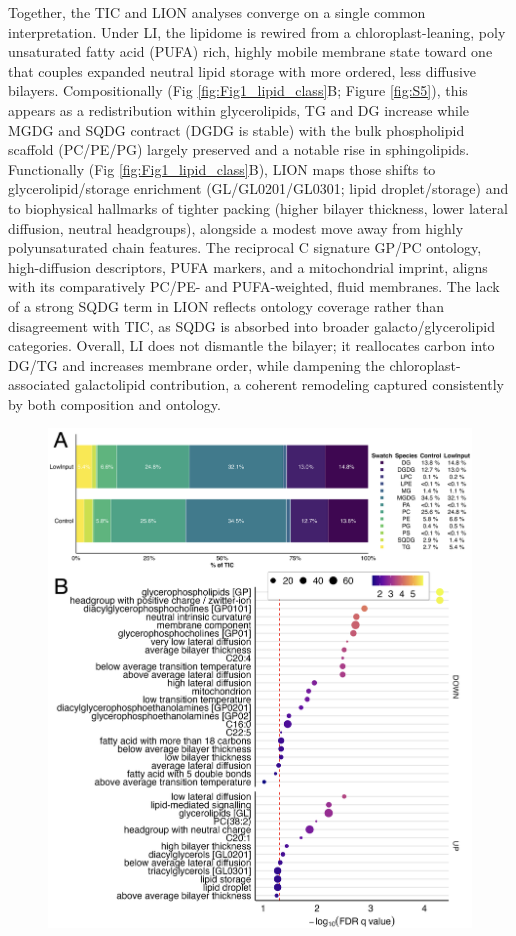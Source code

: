 \documentclass[10pt,letterpaper]{article}
\begin{document}
\begin{itemize}
Together, the TIC and LION analyses converge on a single common interpretation. Under LI, the lipidome is rewired from a chloroplast-leaning, poly unsaturated fatty acid (PUFA) rich, highly mobile membrane state toward one that couples expanded neutral lipid storage with more ordered, less diffusive bilayers. Compositionally (Fig \ref{fig:Fig1_lipid_class}B; Figure \ref{fig:S5}), this appears as a redistribution within glycerolipids, TG and DG increase while MGDG and SQDG contract (DGDG is stable) with the bulk phospholipid scaffold (PC/PE/PG) largely preserved and a notable rise in sphingolipids. Functionally (Fig \ref{fig:Fig1_lipid_class}B), LION maps those shifts to glycerolipid/storage enrichment (GL/GL0201/GL0301; lipid droplet/storage) and to biophysical hallmarks of tighter packing (higher bilayer thickness, lower lateral diffusion, neutral headgroups), alongside a modest move away from highly polyunsaturated chain features. The reciprocal C signature GP/PC ontology, high-diffusion descriptors, PUFA markers, and a mitochondrial imprint, aligns with its comparatively PC/PE- and PUFA-weighted, fluid membranes. The lack of a strong SQDG term in LION reflects ontology coverage rather than disagreement with TIC, as SQDG is absorbed into broader galacto/glycerolipid categories. Overall, LI does not dismantle the bilayer; it reallocates carbon into DG/TG and increases membrane order, while dampening the chloroplast-associated galactolipid contribution, a coherent remodeling captured consistently by both composition and ontology.

\begin{figure}[htbp]
  \centering
  \includegraphics[width=\textwidth]{fig/main/Fig1.png}


\end{figure}
\end{itemize}
\end{document}
